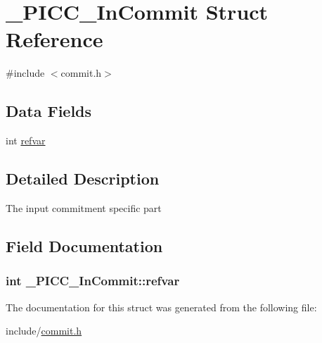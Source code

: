 \hypertarget{struct__PICC__InCommit}{\section{\-\_\-\-P\-I\-C\-C\-\_\-\-In\-Commit Struct Reference}
\label{struct__PICC__InCommit}
}


{\ttfamily \#include $<$commit.\-h$>$}

\subsection*{Data Fields}
{\bf }\par
\begin{DoxyCompactItemize}
\item 
int \hyperlink{struct__PICC__InCommit_ae2a6f1c6244e8165d6b6e80665ded8e9}{refvar}
\end{DoxyCompactItemize}



\subsection{Detailed Description}
The input commitment specific part 

\subsection{Field Documentation}
\hypertarget{struct__PICC__InCommit_ae2a6f1c6244e8165d6b6e80665ded8e9}{
\subsubsection[{refvar}]{\setlength{\rightskip}{0pt plus 5cm}int \-\_\-\-P\-I\-C\-C\-\_\-\-In\-Commit\-::refvar}}\label{struct__PICC__InCommit_ae2a6f1c6244e8165d6b6e80665ded8e9}


The documentation for this struct was generated from the following file\-:\begin{DoxyCompactItemize}
\item 
include/\hyperlink{commit_8h}{commit.\-h}\end{DoxyCompactItemize}
